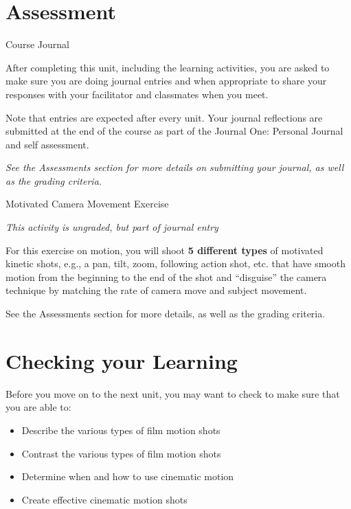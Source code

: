 \documentclass[
]{book}
\providecommand{\tightlist}{%
  \setlength{\itemsep}{0pt}\setlength{\parskip}{0pt}}
\begin{document}
\hypertarget{assessment-6}{%
\section*{Assessment}\label{assessment-6}}

\begin{assessment}
{Course Journal}

After completing this unit, including the learning activities, you are asked to make sure you are doing journal entries and when appropriate to share your responses with your facilitator and classmates when you meet.

Note that entries are expected after every unit. Your journal reflections are submitted at the end of the course as part of the Journal One: Personal Journal and self assessment.

\emph{See the Assessments section for more details on submitting your journal, as well as the grading criteria.}

{Motivated Camera Movement Exercise}

\emph{This activity is ungraded, but part of journal entry}

For this exercise on motion, you will shoot \textbf{5 different types} of motivated kinetic shots, e.g., a pan, tilt, zoom, following action shot, etc. that have smooth motion from the beginning to the end of the shot and ``disguise'' the camera technique by matching the rate of camera move and subject movement.

See the Assessments section for more details, as well as the grading criteria.
\end{assessment}

\hypertarget{checking-your-learning-3}{%
\section*{Checking your Learning}\label{checking-your-learning-3}}

\begin{progress}
Before you move on to the next unit, you may want to check to make sure that you are able to:

\begin{itemize}
\tightlist
\item
  Describe the various types of film motion shots
\item
  Contrast the various types of film motion shots
\item
  Determine when and how to use cinematic motion
\item
  Create effective cinematic motion shots
\end{itemize}
\end{progress}
\end{document}
